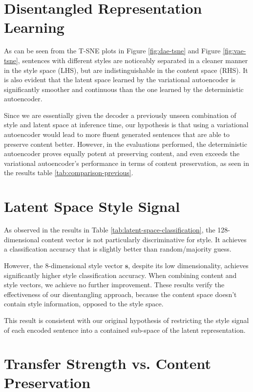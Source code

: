 \section{Disentangled Representation Learning}

As can be seen from the T-SNE plots in Figure \ref{fig:dae-tsne} and Figure \ref{fig:vae-tsne}, sentences with different styles are noticeably separated in a cleaner manner in the style space (LHS), but are indistinguishable in the content space (RHS). It is also evident that the latent space learned by the variational autoencoder is significantly smoother and continuous than the one learned by the deterministic autoencoder.

Since we are essentially given the decoder a previously unseen combination of style and latent space at inference time, our hypothesis is that using a variational autoencoder would lead to more fluent generated sentences that are able to preserve content better. However, in the evaluations performed, the deterministic autoencoder proves equally potent at preserving content, and even exceeds the variational autoencoder's performance in terms of content preservation, as seen in the results table \ref{tab:comparison-previous}.


\section{Latent Space Style Signal}

As observed in the results in Table \ref{tab:latent-space-classification}, the 128-dimensional content vector is not particularly discriminative for style. It achieves a classification accuracy that is slightly better than random/majority guess.

However, the 8-dimensional style vector $\bm s$, despite its low dimensionality, achieves significantly higher style classification accuracy. When combining content and style vectors, we achieve no further improvement. These results verify the effectiveness of our disentangling approach, because the content space doesn't contain style information, opposed to the style space.

This result is consistent with our original hypothesis of restricting the style signal of each encoded sentence into a contained sub-space of the latent representation.


\section{Transfer Strength vs. Content Preservation}

